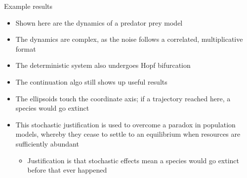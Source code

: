 \documentclass[presentation]{beamer}
\begin{document}
\begin{frame}[label={sec:org431123f},plain]{Example results}
\begin{itemize}
\item Shown here are the dynamics of a predator prey model
\item The dynamics are complex, as the noise follows a correlated, multiplicative format
\item The deterministic system also undergoes Hopf bifurcation
\item The continuation algo still shows up useful results
\item The ellipsoids touch the coordinate axis; if a trajectory reached here, a species would go extinct
\item This stochastic justification is used to overcome a paradox in population models, whereby they cease to settle to an equilibrium when resources are sufficiently abundant
\begin{itemize}
\item Justification is that stochastic effects mean a species would go extinct before that ever happened
\end{itemize}
\end{itemize}
\end{frame}
\end{document}
